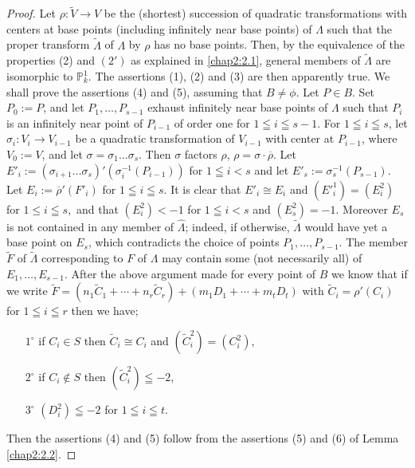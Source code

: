 \begin{proof}
Let $\rho:\widetilde{V}\to V$ be the (shortest) succession of
quadratic transformations with centers at base points (including
infinitely near base points) of $\Lambda$ such that the proper
transform $\widetilde{\Lambda}$ of $\Lambda$ by $\rho$ has no base
points. Then, by the equivalence of the properties (2) and $(2')$ as
explained in \ref{chap2:2.1}, general members of $\widetilde{\Lambda}$ are
isomorphic to $\mathbb{P}^{1}_{k}$. The assertions (1), (2) and (3)
are then apparently true. We shall prove the assertions (4) and (5),
assuming that $B\neq \phi$. Let $P\in B$. Set $P_{0}:=P$, and let
$P_{1},\ldots,P_{s-1}$ exhaust infinitely near base points of
$\Lambda$ such that $P_{i}$ is an infinitely near point of $P_{i-1}$
of order one for $1\leqq i\leqq s-1$. For $1\leqq i\leqq s$, let
$\sigma_{i}:V_{i}\to V_{i-1}$ be a quadratic transformation of
$V_{i-1}$ with center at $P_{i-1}$, where $V_{0}:=V$, and let
$\sigma=\sigma_{1}\ldots\sigma_{s}$. Then $\sigma$ factors $\rho$,
\iec $\rho=\sigma\cdot \overline{\rho}$. Let
$E'_{i}:=(\sigma_{i+1}\ldots\sigma_{s})'(\sigma^{-1}_{i}(P_{i-1}))$
for $1\leqq i<s$ and let $E'_{s}:=\sigma^{-1}_{s}(P_{s-1})$. Let
$E_{i}:=\overline{\rho}'(F'_{i})$ for $1\leqq i\leqq s$. It is clear
that $E'_{i}\cong E_{i}$ and $({E'}^{1}_{i})=(E^{2}_{i})$ for $1\leq
i\leqq s$,\pageoriginale\  and that $(E^{2}_{i})<-1$ for $1\leqq i<s$
and $(E^{2}_{s})=-1$. Moreover $E_{s}$ is not contained in any member
of $\widehat{\Lambda}$; indeed, if otherwise, $\widetilde{\Lambda}$
would have yet a base point on $E_{s}$, which contradicts the choice
of points $P_{1},\ldots,P_{s-1}$. The member $\widetilde{F}$ of
$\widetilde{\Lambda}$ corresponding to $F$ of $\Lambda$ may contain
some (not necessarily all) of $E_{1},\ldots,E_{s-1}$. After the above
argument made for every point of $B$ we know that if we write
$\widetilde{F}=(n_{1}\widetilde{C}_{1}+\cdots+n_{r}\widetilde{C}_{r})+(m_{1}D_{1}+\cdots+m_{t}D_{t})$
with $\widetilde{C}_{i}=\rho'(C_{i})$ for $1\leqq i\leqq r$ then we
have;
\begin{itemize}
\item[$1^{\circ}$] if $C_{i}\in S$ then $\widetilde{C}_{i}\cong C_{i}$
    and $(\widetilde{C}^{2}_{i})=(C^{2}_{i})$,

\item[$2^{\circ}$] if $C_{i}\not\in S$ then
  $(\widetilde{C}^{2}_{i})\leqq -2$,

\item[$3^{\circ}$] $(D^{2}_{i})\leqq -2$ for $1\leqq i\leqq t$.
\end{itemize}
Then the assertions (4) and (5) follow from the assertions (5) and (6)
of Lemma \ref{chap2:2.2}.
\end{proof}


